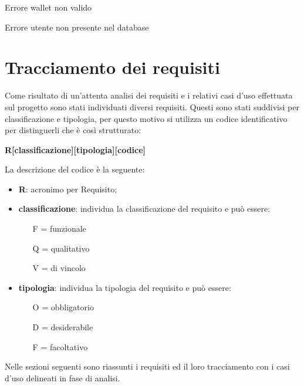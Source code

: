 \begin{usecase}{11}{Errore wallet non valido}\label{uc11}
\end{usecase}

\begin{usecase}{12}{Errore utente non presente nel database}\label{uc12}
\end{usecase}

\section{Tracciamento dei requisiti}
\label{bsec:tracciamento-requisiti}

Come risultato di un'attenta analisi dei requisiti e i relativi casi d'uso effettuata sul progetto sono stati individuati diversi requisiti. Questi sono stati suddivisi per classificazione e tipologia, per questo motivo si utilizza un codice identificativo per distinguerli che è così strutturato:
\begin{center}
	\textbf{R[classificazione][tipologia][codice]}
\end{center}
La descrizione del codice è la seguente:
\begin{itemize}
	\item \textbf{R}: acronimo per Requisito;
	\item \textbf{classificazione}: individua la classificazione del requisito e può essere:
	\begin{itemize}
		\item [F =] funzionale
		\item [Q =] qualitativo
		\item [V =]  di vincolo
	\end{itemize}
	\item \textbf{tipologia}: individua la tipologia del requisito e può essere:
	\begin{itemize}
		\item [O =] obbligatorio
		\item [D =] desiderabile
		\item [F =] facoltativo
	\end{itemize}
\end{itemize}

Nelle sezioni seguenti sono riassunti i requisiti ed il loro tracciamento con i casi d'uso delineati in fase di analisi.

